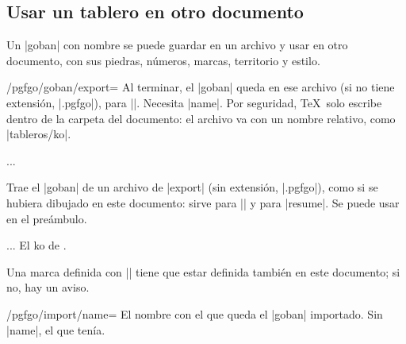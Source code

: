 	\subsection{Usar un tablero en otro documento}
	\label{subsec:exportar}
	Un |goban| con nombre se puede guardar en un archivo y usar en otro documento, con sus piedras, números, marcas, territorio y estilo.

	\begin{key}{/pgfgo/goban/export=}
		Al terminar, el |goban| queda en ese archivo (si no tiene extensión, |.pgfgo|), para |\pgfgoimport|. Necesita |name|. Por seguridad, \TeX\ solo escribe dentro de la carpeta del documento: el archivo va con un nombre relativo, como |tableros/ko|.

		\begin{codeexample}
			\begin{goban}[19, name = ko, export = ko]
				...
			\end{goban}
		\end{codeexample}
	\end{key}

	\begin{command}{\pgfgoimport{}}
		Trae el |goban| de un archivo de |export| (sin extensión, |.pgfgo|), como si se hubiera dibujado en este documento: sirve para |\pgfgoview| y para |resume|. Se puede usar en el preámbulo.

		\begin{codeexample}
			...
			El ko de .
			\begin{goban}[resume = {otro ko, marks}]
			\end{goban}
		\end{codeexample}

		Una marca definida con |\pgfgodefinemark| tiene que estar definida también en este documento; si no, hay un aviso.
	\end{command}

	\begin{key}{/pgfgo/import/name=}
		El nombre con el que queda el |goban| importado. Sin |name|, el que tenía.
	\end{key}
